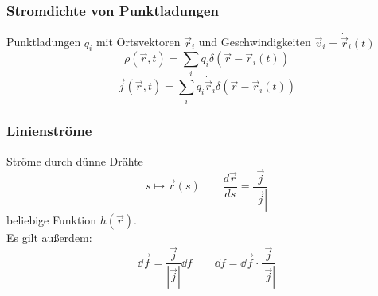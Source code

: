 \subsubsection{Stromdichte von Punktladungen}

Punktladungen $ q_i $ mit Ortsvektoren $ \vec{r}_i $ und Geschwindigkeiten $ \vec{v}_i = \dot{\vec{r}}_i(t) $
\begin{equation*}
\rho(\vec{r},t) = \sum_i q_i \delta(\vec{r} - \vec{r}_i(t)) 
\end{equation*}
\begin{equation*}
\vec{j}(\vec{r},t) = \sum_i q_i \dot{\vec{r}}_i \delta(\vec{r} - \vec{r}_i(t))
\end{equation*}
\begin{minipage}{.6\linewidth}
	\subsubsection{Linienströme}
	
	Ströme durch dünne Drähte
	$$ s \mapsto \vec{r}(s) \qquad \frac{d\vec{r}}{ds} = \frac{\vec{j}}{|\vec{j}|} $$
	beliebige Funktion $ h(\vec{r}) $.\\
	Es gilt außerdem:
	\begin{equation*}
	\dd \vec{f} = \frac{\vec{j}}{|\vec{j}|} \dd f \qquad \dd f = \dd \vec{f} \cdot \frac{\vec{j}}{|\vec{j}|}
	\end{equation*}
\end{minipage}%

